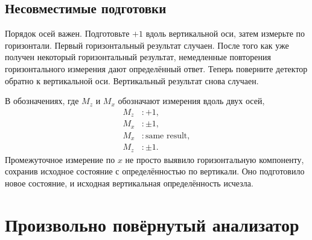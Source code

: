 \subsection{Несовместимые подготовки}

Порядок осей важен. Подготовьте \(+1\) вдоль вертикальной оси, затем измерьте по горизонтали. Первый горизонтальный результат случаен. После того как уже получен некоторый горизонтальный результат, немедленные повторения горизонтального измерения дают определённый ответ. Теперь поверните детектор обратно к вертикальной оси. Вертикальный результат снова случаен.

В обозначениях, где \(M_z\) и \(M_x\) обозначают измерения вдоль двух осей,
\begin{equation}
\begin{aligned}
  M_z&:+1,\\
  M_x&:\pm1,\\
  M_x&:\text{same result},\\
  M_z&:\pm1.
\end{aligned}
\end{equation}
Промежуточное измерение по \(x\) не просто выявило горизонтальную компоненту, сохранив исходное состояние с определённостью по вертикали. Оно подготовило новое состояние, и исходная вертикальная определённость исчезла.

\begin{classroomqa}
\end{classroomqa}

\begin{classroomqa}
\end{classroomqa}

\section{Произвольно повёрнутый анализатор}

